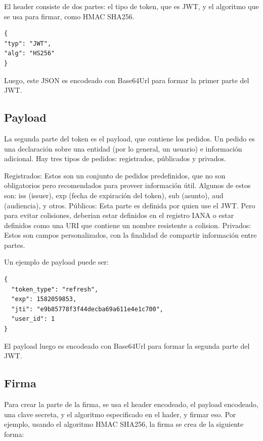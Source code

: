 El header consiste de dos partes: el tipo de token, que es JWT, y el algoritmo que se usa para firmar, como HMAC SHA256.

\begin{verbatim}
{
"typ": "JWT",
"alg": "HS256"
}
\end{verbatim}
Luego, este JSON es encodeado con Base64Url para formar la primer parte del JWT.

\subsection[Payload]{Payload}

La segunda parte del token es el payload, que contiene los pedidos. Un pedido es una declaración sobre una entidad (por lo general, un usuario) e información adicional. Hay tres tipos de pedidos: registrados, públicados y privados.

\begin{outline}
    \1 Registrados: Estos son un conjunto de pedidos predefinidos, que no son obligatorios pero recomendados para proveer información útil. Algunos de estos son: iss (issuer), exp (fecha de expiración del token), sub (asunto), aud (audiencia), y otros.
    \1 Públicos: Esta parte es definida por quien use el JWT. Pero para evitar colisiones, deberian estar definidos en el registro IANA o estar definidos como una URI que contiene un nombre resistente a colision.
    \1 Privados: Estos son campos personalizados, con la finalidad de compartir información entre partes.
\end{outline}

Un ejemplo de payload puede ser: 

\begin{verbatim}
{
  "token_type": "refresh",
  "exp": 1582059853,
  "jti": "e9b85778f3f44decba69a611e4e1c700",
  "user_id": 1
}
\end{verbatim}

El payload luego es encodeado con Base64Url para formar la segunda parte del JWT.

\subsection[Firma]{Firma}

Para crear la parte de la firma, se usa el header encodeado, el payload encodeado, una clave secreta, y el algoritmo especificado en el hader, y firmar eso.
Por ejemplo, usando el algoritmo HMAC SHA256, la firma se crea de la siguiente forma: 

